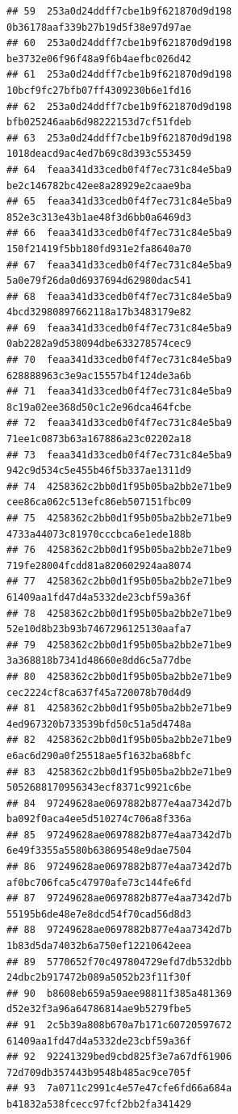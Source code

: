\documentclass[]{article}
\begin{document}
\begin{verbatim}
## 59  253a0d24ddff7cbe1b9f621870d9d198   0b36178aaf339b27b19d5f38e97d97ae
## 60  253a0d24ddff7cbe1b9f621870d9d198   be3732e06f96f48a9f6b4aefbc026d42
## 61  253a0d24ddff7cbe1b9f621870d9d198   10bcf9fc27bfb07ff4309230b6e1fd16
## 62  253a0d24ddff7cbe1b9f621870d9d198   bfb025246aab6d98222153d7cf51fdeb
## 63  253a0d24ddff7cbe1b9f621870d9d198   1018deacd9ac4ed7b69c8d393c553459
## 64  feaa341d33cedb0f4f7ec731c84e5ba9   be2c146782bc42ee8a28929e2caae9ba
## 65  feaa341d33cedb0f4f7ec731c84e5ba9   852e3c313e43b1ae48f3d6bb0a6469d3
## 66  feaa341d33cedb0f4f7ec731c84e5ba9   150f21419f5bb180fd931e2fa8640a70
## 67  feaa341d33cedb0f4f7ec731c84e5ba9   5a0e79f26da0d6937694d62980dac541
## 68  feaa341d33cedb0f4f7ec731c84e5ba9   4bcd32980897662118a17b3483179e82
## 69  feaa341d33cedb0f4f7ec731c84e5ba9   0ab2282a9d538094dbe633278574cec9
## 70  feaa341d33cedb0f4f7ec731c84e5ba9   628888963c3e9ac15557b4f124de3a6b
## 71  feaa341d33cedb0f4f7ec731c84e5ba9   8c19a02ee368d50c1c2e96dca464fcbe
## 72  feaa341d33cedb0f4f7ec731c84e5ba9   71ee1c0873b63a167886a23c02202a18
## 73  feaa341d33cedb0f4f7ec731c84e5ba9   942c9d534c5e455b46f5b337ae1311d9
## 74  4258362c2bb0d1f95b05ba2bb2e71be9   cee86ca062c513efc86eb507151fbc09
## 75  4258362c2bb0d1f95b05ba2bb2e71be9   4733a44073c81970cccbca6e1ede188b
## 76  4258362c2bb0d1f95b05ba2bb2e71be9   719fe28004fcdd81a820602924aa8074
## 77  4258362c2bb0d1f95b05ba2bb2e71be9   61409aa1fd47d4a5332de23cbf59a36f
## 78  4258362c2bb0d1f95b05ba2bb2e71be9   52e10d8b23b93b7467296125130aafa7
## 79  4258362c2bb0d1f95b05ba2bb2e71be9   3a368818b7341d48660e8dd6c5a77dbe
## 80  4258362c2bb0d1f95b05ba2bb2e71be9   cec2224cf8ca637f45a720078b70d4d9
## 81  4258362c2bb0d1f95b05ba2bb2e71be9   4ed967320b733539bfd50c51a5d4748a
## 82  4258362c2bb0d1f95b05ba2bb2e71be9   e6ac6d290a0f25518ae5f1632ba68bfc
## 83  4258362c2bb0d1f95b05ba2bb2e71be9   5052688170956343ecf8371c9921c6be
## 84  97249628ae0697882b877e4aa7342d7b   ba092f0aca4ee5d510274c706a8f336a
## 85  97249628ae0697882b877e4aa7342d7b   6e49f3355a5580b63869548e9dae7504
## 86  97249628ae0697882b877e4aa7342d7b   af0bc706fca5c47970afe73c144fe6fd
## 87  97249628ae0697882b877e4aa7342d7b   55195b6de48e7e8dcd54f70cad56d8d3
## 88  97249628ae0697882b877e4aa7342d7b   1b83d5da74032b6a750ef12210642eea
## 89  5770652f70c497804729efd7db532dbb   24dbc2b917472b089a5052b23f11f30f
## 90  b8608eb659a59aee98811f385a481369   d52e32f3a96a64786814ae9b5279fbe5
## 91  2c5b39a808b670a7b171c60720597672   61409aa1fd47d4a5332de23cbf59a36f
## 92  92241329bed9cbd825f3e7a67df61906   72d709db357443b9548b485ac9ce705f
## 93  7a0711c2991c4e57e47cfe6fd66a684a   b41832a538fcecc97fcf2bb2fa341429

\end{verbatim}
\end{document}
